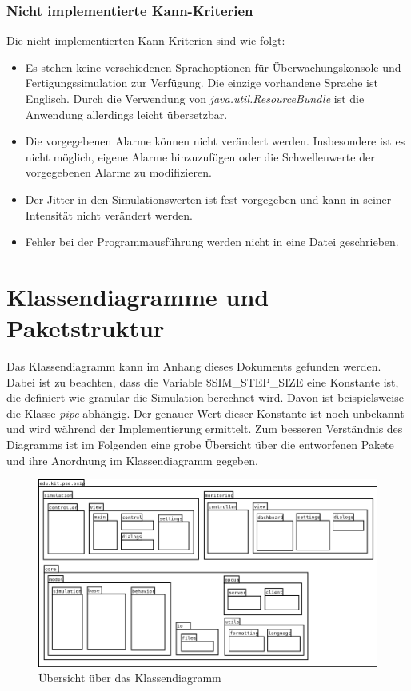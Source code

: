 \documentclass[parskip=full]{scrartcl}
\begin{document}
\subsubsection{Nicht implementierte Kann-Kriterien}
Die nicht implementierten Kann-Kriterien sind wie folgt:

\begin{itemize}
    \item Es stehen keine verschiedenen Sprachoptionen f\"ur \"Uberwachungskonsole und Fertigungssimulation zur Verf\"ugung.
    Die einzige vorhandene Sprache ist Englisch. Durch die Verwendung von \emph{java.util.ResourceBundle} ist die Anwendung allerdings leicht übersetzbar.
    \item Die vorgegebenen Alarme k\"onnen nicht ver\"andert werden. Insbesondere ist es nicht m\"oglich, eigene Alarme hinzuzuf\"ugen
    oder die Schwellenwerte der vorgegebenen Alarme zu modifizieren.
    \item Der Jitter in den Simulationswerten ist fest vorgegeben und kann in seiner Intensit\"at nicht ver\"andert werden.
    \item Fehler bei der Programmausf\"uhrung werden nicht in eine Datei geschrieben.
\end{itemize}

\section{Klassendiagramme und Paketstruktur}
Das Klassendiagramm kann im Anhang dieses Dokuments gefunden werden. Dabei ist zu beachten, dass die Variable \$SIM_STEP_SIZE eine Konstante ist,
die definiert wie granular die Simulation berechnet wird. Davon ist beispielsweise die Klasse \emph{pipe} abhängig. Der genauer Wert dieser
Konstante ist noch unbekannt und wird während der Implementierung ermittelt. Zum besseren Verständnis des Diagramms ist im Folgenden
eine grobe Übersicht über die entworfenen Pakete und ihre Anordnung im Klassendiagramm gegeben.

\begin{figure}[H]
  \centering
  \includegraphics[scale=0.45]{design/class-diagram-map.png}
  \caption{Übersicht über das Klassendiagramm}
\end{figure}
\end{document}
